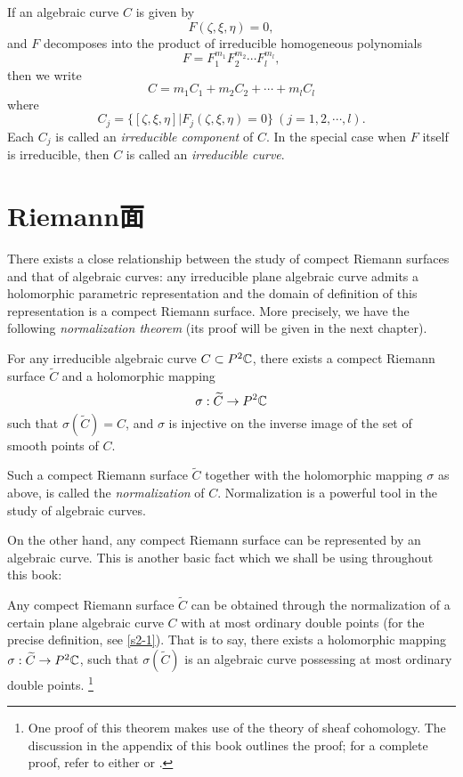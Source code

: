 If an algebraic curve $C$ is given by 
\[F(\zeta,\xi,\eta)=0, \]
and $F$ decomposes into the product of irreducible homogeneous polynomials 
\[F=F_1^{m_1}F_2^{m_2}\cdots F_l^{m_l}, \]
then we write 
\[C=m_1C_1+m_2C_2+\cdots+m_lC_l\]
where 
\[C_j=\{[\zeta,\xi,\eta]|F_j(\zeta,\xi,\eta)=0\}\ (j=1,2,\cdots,l). \]
Each $C_j$ is called an \textit{irreducible component} of $C$. In the special case when $F$ itself is irreducible, then $C$ is called an \textit{irreducible curve}. 

\section{Riemann面}\label{s1-2}
There exists a close relationship between the study of compect Riemann surfaces and that of algebraic curves: any irreducible plane algebraic curve admits a holomorphic parametric representation and the domain of definition of this representation is a compect Riemann surface. More precisely, we have the following \textit{normalization theorem} (its proof will be given in the next chapter). 
\begin{theorem}
    For any irreducible algebraic curve $C\subset P^2\mathbb{C}$, there exists a compect Riemann surface $\widetilde{C}$ and a holomorphic mapping 
    \[\sigma:\widetilde{C}\to P^2\mathbb{C}\]
    such that $\sigma(\widetilde{C})=C$, and $\sigma$ is injective on the inverse image of the set of smooth points of $C$. 
\end{theorem}

Such a compect Riemann surface $\widetilde{C}$ together with the holomorphic mapping $\sigma$ as above, is called the \textit{normalization} of $C$. Normalization is a powerful tool in the study of algebraic curves. 

On the other hand, any compect Riemann surface can be represented by an algebraic curve. This is another basic fact which we shall be using throughout this book: 
\begin{theorem}
    Any compect Riemann surface $\widetilde{C}$ can be obtained through the normalization of a certain plane algebraic curve $C$ with at most ordinary double points (for the precise definition, see \autoref{s2-1}). That is to say, there exists a holomorphic mapping $\sigma:\widetilde{C}\to P^2\mathbb{C}$, such that $\sigma(\widetilde{C})$ is an algebraic curve possessing at most ordinary double points. \footnote{One proof of this theorem makes use of the theory of sheaf cohomology. The discussion in the appendix of this book outlines the proof; for a complete proof, refer to either \cite[chapter 2]{MR1288523} or \cite[section 5.21]{MR703513}.}
\end{theorem}

